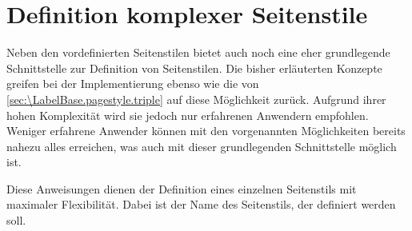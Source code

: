 \section{Definition komplexer Seitenstile}

\iffree{}{\enlargethispage{-.8\baselineskip}}%
Neben den vordefinierten Seitenstilen bietet  auch
noch eine eher grundlegende Schnittstelle zur Definition von Seitenstilen. Die
bisher erläuterten Konzepte greifen bei der Implementierung %
\iftrue ebenso wie die von \autoref{sec:\LabelBase.pagestyle.triple} \fi %
auf diese Möglichkeit zurück. %
\iftrue %
Aufgrund ihrer hohen Komplexität wird sie jedoch nur erfahrenen Anwendern
empfohlen. Weniger erfahrene Anwender können mit den vorgenannten
Möglichkeiten bereits nahezu alles erreichen, was auch mit dieser
grundlegenden Schnittstelle möglich ist. %
\else %
Sie ist jedoch hoch komplex und wird von Anwender nur sehr selten benötigt.
\fi

\begin{Declaration}
\end{Declaration}
Diese Anweisungen dienen der Definition eines einzelnen Seitenstils mit
maximaler Flexibilität. Dabei ist  der Name des Seitenstils, der
definiert werden soll.

